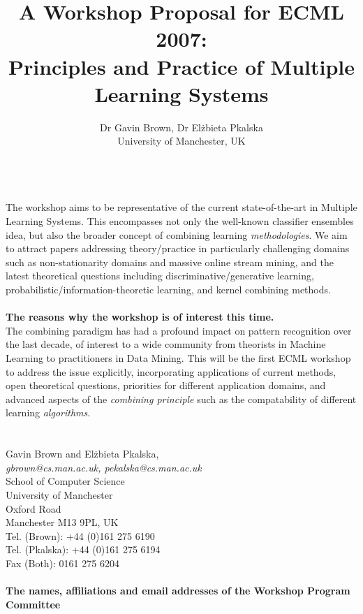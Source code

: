 \documentclass[a4]{article}
\title{A Workshop Proposal for ECML 2007:\\
\bf Principles and Practice of Multiple Learning Systems}
\author{Dr Gavin Brown, Dr El\.zbieta P\e{}kalska\\University of Manchester, UK}
\date{}
\begin{document}
\maketitle

\\
The workshop aims to be representative of the current
state-of-the-art in Multiple Learning Systems.  This encompasses not
only the well-known classifier ensembles idea, but also the broader
concept of combining learning {\em methodologies}.  We aim to attract papers
addressing theory/practice in particularly challenging domains such
as non-stationarity domains and massive online stream mining, and
the latest theoretical questions including discriminative/generative
learning, probabilistic/information-theoretic learning, and kernel
combining methods.\\
\\
{\bf The reasons why the workshop is of interest this time.}\\
The combining paradigm has had a profound impact on pattern
recognition over the last decade, of interest to a wide community
from theorists in Machine Learning to practitioners in Data Mining.
This will be the first ECML workshop to address the issue
explicitly, incorporating applications of current methods, open
theoretical questions, priorities for different application domains,
and advanced aspects of the \emph{combining principle} such as the
compatability of different
learning \emph{algorithms}.\\
\\
\\
Gavin Brown and El\.zbieta P\e{}kalska,\\[1mm]
\emph{gbrown@cs.man.ac.uk, pekalska@cs.man.ac.uk}\\
School of Computer Science\\
University of Manchester\\
Oxford Road\\
Manchester M13 9PL, UK\\
Tel. (Brown): +44 (0)161 275 6190\\
Tel. (P\e{}kalska): +44 (0)161 275 6194\\
Fax (Both): 0161 275 6204\\
\\
{\bf The names, affiliations and email addresses of the Workshop
Program Committee}
\end{document}
